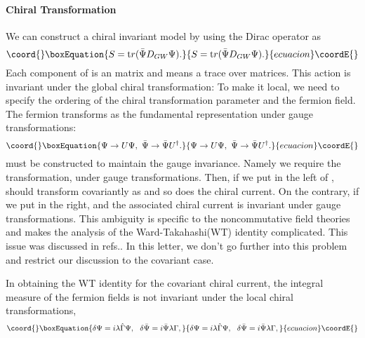 \documentclass[a4paper,prl,showpacs,twocolumn]{revtex4}
\begin{document}
\paragraph{{\bf Chiral Transformation}}
We can construct a chiral invariant model 
by using the Dirac operator \coordHE{} as
\begin{equation}\coord{}\boxEquation{
 S= {\text tr}(\bar\Psi D_{GW} \Psi).
}{
 S= {\text tr}(\bar\Psi D_{GW} \Psi).
}{ecuacion}\coordE{}\end{equation}
Each component of \myHighlight{$\Psi$}\coordHE{} is an \coordHE{} matrix
and \coordHE{} means a trace over matrices.
This action is invariant under the global chiral 
transformation:
\coordHE{}
To make it local, we need to specify the 
ordering of the chiral transformation parameter \myHighlight{$\lambda$}\coordHE{}
and the fermion field.
The fermion transforms as
 the fundamental representation under gauge transformations:
\begin{equation}\coord{}\boxEquation{
\Psi \rightarrow U \Psi, \ \bar\Psi \rightarrow \bar\Psi U^{\dagger}.
\label{gaugetr}
}{
\Psi \rightarrow U \Psi, \ \bar\Psi \rightarrow \bar\Psi U^{\dagger}.
}{ecuacion}\coordE{}\end{equation}
\coordHE{} must be constructed to maintain the gauge invariance.
Namely we require the transformation, 
\coordHE{} 
under gauge transformations.
Then, if we put \myHighlight{$\lambda$}\coordHE{} in the left of \myHighlight{$\Psi$}\coordHE{}, 
\myHighlight{$\lambda$}\coordHE{} should transform covariantly as
\coordHE{} and 
so does the chiral current.
On the contrary, if we put \myHighlight{$\lambda$}\coordHE{} in the right,
\myHighlight{$\lambda$}\coordHE{} and the associated chiral current is invariant
under gauge transformations.
This ambiguity is specific to the noncommutative field theories 
and makes the analysis of the Ward-Takahashi(WT)
identity complicated.
This issue was discussed in refs.\cite{anomaly,AIN}.
In this letter, we don't go further into this problem and
restrict our discussion to the covariant case.
\par
In obtaining the WT identity for the covariant
chiral current, the integral measure of the fermion fields
is not invariant under the local chiral transformations,
\begin{equation}\coord{}\boxEquation{
 \delta \Psi =i \lambda \hat{\Gamma} \Psi, \ \
 \delta \bar{\Psi} = i \bar{\Psi}\lambda \Gamma,
}{
 \delta \Psi =i \lambda \hat{\Gamma} \Psi, \ \
 \delta \bar{\Psi} = i \bar{\Psi}\lambda \Gamma,
}{ecuacion}\coordE{}\end{equation}
\end{document}
